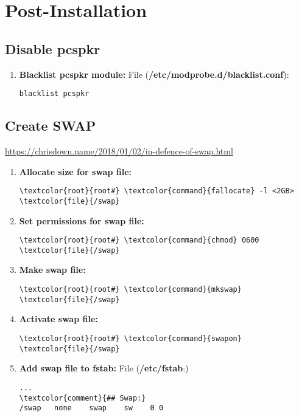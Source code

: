 \documentclass[10pt, a4paper, onecolumn, openany]{book} %
\begin{document}
\chapter{Post-Installation}
\section{Disable pcspkr}
\begin{enumerate}
    \item \textbf{Blacklist pcspkr module:}
\newline File (\textbf{\textcolor{file}{/etc/modprobe.d/blacklist.conf}}):
\begin{Verbatim}[commandchars=\\\{\}]
blacklist pcspkr
\end{Verbatim}
\end{enumerate}
\section{Create SWAP}
\underline{\href{https://chrisdown.name/2018/01/02/in-defence-of-swap.html}{https://chrisdown.name/2018/01/02/in-defence-of-swap.html}}
\begin{enumerate}
    \item \textbf{Allocate size for swap file:}
\begin{Verbatim}[commandchars=\\\{\}]
\textcolor{root}{root#} \textcolor{command}{fallocate} -l <2GB> \textcolor{file}{/swap}
\end{Verbatim}
        \item \textbf{Set permissions for swap file:}
\begin{Verbatim}[commandchars=\\\{\}]
\textcolor{root}{root#} \textcolor{command}{chmod} 0600 \textcolor{file}{/swap}
\end{Verbatim}
    \item \textbf{Make swap file:}
\begin{Verbatim}[commandchars=\\\{\}]
\textcolor{root}{root#} \textcolor{command}{mkswap} \textcolor{file}{/swap}
\end{Verbatim}
    \item \textbf{Activate swap file:}
\begin{Verbatim}[commandchars=\\\{\}]
\textcolor{root}{root#} \textcolor{command}{swapon} \textcolor{file}{/swap}
\end{Verbatim}
    \item \textbf{Add swap file to fstab:}
\newline File (\textbf{\textcolor{file}{/etc/fstab}}:)    
\begin{Verbatim}[commandchars=\\\{\}]
...
\textcolor{comment}{## Swap:}
/swap   none    swap    sw    0 0
\end{Verbatim}
\end{enumerate}
\end{document}
